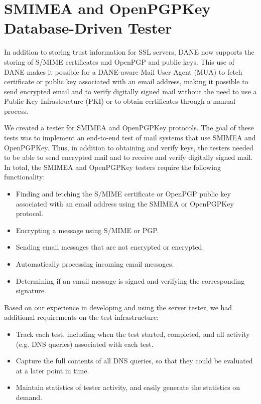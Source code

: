 \documentclass[preprint,3p,11pt]{elsarticle}
\begin{document}
\section{SMIMEA and OpenPGPKey Database-Driven Tester}
In addition to storing trust information for SSL servers, DANE now
supports the storing of S/MIME certificates and OpenPGP and public keys. This use
of DANE makes it possible for a DANE-aware Mail User Agent (MUA) to
fetch certificate or public key associated with an email address,
making it possible to send encrypted email and to verify digitally
signed mail without the need to use a Public Key Infrastructure (PKI)
or to obtain certificates through a manual process.

We created a tester for SMIMEA and OpenPGPKey protocols. The goal of
these tests was to implement an end-to-end test of mail systems that
use SMIMEA and OpenPGPKey. Thus, in addition to obtaining and verify
keys, the testers needed to be able to send encrypted mail and to
receive and verify digitally signed mail. In total, the 
SMIMEA and OpenPGPKey testers require the following functionality:

\begin{itemize}
\item Finding and fetching the S/MIME certificate or OpenPGP public
  key associated with an email address using the SMIMEA or OpenPGPKey
  protocol.
\item Encrypting a message using S/MIME or PGP.
\item Sending email messages that are not encrypted or encrypted.
\item Automatically processing incoming email messages.
\item Determining if an email message is signed and verifying the
  corresponding signature. 
\end{itemize}

\noindent Based on our experience in developing and using the server tester, we
had additional requirements on the test infrastructure:

\begin{itemize}
\item Track each test, including when the test started, completed, and
  all activity (e.g. DNS queries) associated with each test.
\item Capture the full contents of all DNS queries, so that they could
  be evaluated at a later point in time.
\item Maintain statistics of tester activity, and easily generate the
  statistics on demand.
\end{itemize}
\end{document}
